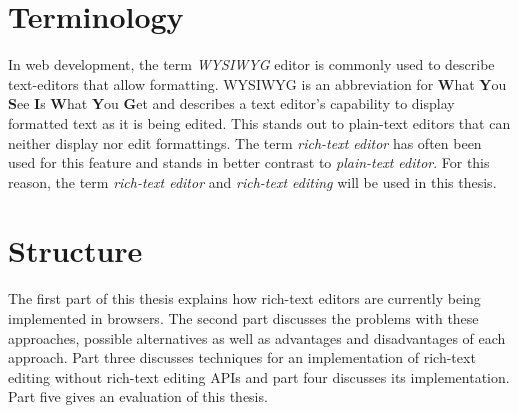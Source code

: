 \section{Terminology}

In web development, the term \textit{WYSIWYG} editor is commonly used to describe text-editors that allow formatting. WYSIWYG is an abbreviation for \textbf{W}hat \textbf{Y}ou \textbf{S}ee \textbf{I}s \textbf{W}hat \textbf{Y}ou \textbf{G}et and describes a text editor's capability to display formatted text as it is being edited. This stands out to plain-text editors that can neither display nor edit formattings. The term \textit{rich-text editor} has often been used for this feature and stands in better contrast to \textit{plain-text editor}. For this reason, the term \textit{rich-text editor} and \textit{rich-text editing} will be used in this thesis.

\section{Structure}

The first part of this thesis explains how rich-text editors are currently being implemented in browsers. The second part discusses the problems with these approaches, possible alternatives as well as advantages and disadvantages of each approach. Part three discusses techniques for an implementation of rich-text editing without rich-text editing APIs and part four discusses its implementation. Part five gives an evaluation of this thesis.